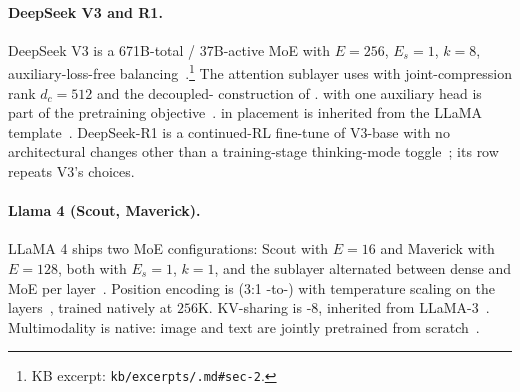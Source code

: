 \paragraph{DeepSeek V3 and R1.}
DeepSeek V3 is a 671B-total / 37B-active MoE with
$E = 256$, $E_s = 1$, $k = 8$, auxiliary-loss-free
balancing~\citep[\S 2.2]{deepseek-v3}.\footnote{KB excerpt:
\texttt{kb/excerpts/.md\#sec-2}.} The attention sublayer
uses  with joint-compression rank $d_c = 512$ and the
decoupled- construction of \citet[\S 2.1.2 Eq.~9]{deepseek-v2}.
 with one auxiliary head is part of the
pretraining objective~\citep[\S 2.3.1]{deepseek-v3}.
 in  placement is inherited from the LLaMA
template~\citep{touvron2023}. DeepSeek-R1 is a continued-RL fine-tune
of V3-base with no architectural changes other than a training-stage
thinking-mode toggle~\citep[\S 2]{deepseek-r1}; its row repeats V3's
choices.

\paragraph{Llama 4 (Scout, Maverick).}
LLaMA 4 ships two MoE configurations: Scout with $E = 16$ and
Maverick with $E = 128$, both with $E_s = 1$, $k = 1$, and the 
sublayer alternated between dense  and MoE per
layer~\citep[\S 2.1]{meta-llama4}. Position encoding is  (3:1
-to-) with temperature scaling on the 
layers~\citep[\S 2.1, \S 2.4]{meta-llama4}, trained natively at
$256\text{K}$. KV-sharing is -8, inherited from
LLaMA-3~\citep[\S 3.1]{meta-llama3}. Multimodality is native: image
and text are jointly pretrained from scratch~\citep[\S 2]{meta-llama4}.


